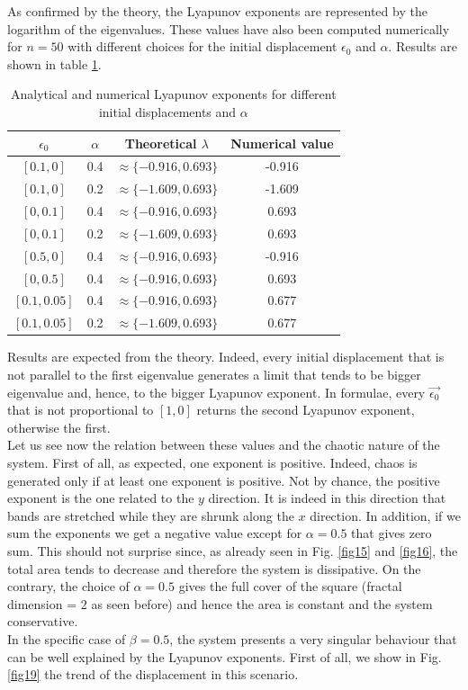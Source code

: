 \documentclass[11pt,titlepage]{article}
\begin{document}
As confirmed by the theory, the Lyapunov exponents are represented by the logarithm of the eigenvalues. These values have also been computed numerically for $n=50$ with different choices for the initial displacement $\epsilon_0$ and $\alpha$. Results are shown in table \ref{tab8}. \\

\begin{table}[h]
	\centering
	\caption{Analytical and numerical Lyapunov exponents for different initial displacements and $\alpha$} \label{tab8}
	\begin{tabular}{ | c |c | c | c |}
		\hline
		$\epsilon_0$ & $\alpha$ & Theoretical $\lambda$ & Numerical value \\
		\hline
		$[0.1,0]$ & 0.4 & $\approx \{ -0.916, 0.693\}$& -0.916\\
		\hline
		$[0.1,0]$ & 0.2 & $\approx \{ -1.609, 0.693\}$& -1.609\\
		\hline
		$[0,0.1]$ & 0.4& $\approx \{ -0.916, 0.693\}$& 0.693\\
		\hline
		$[0,0.1]$ & 0.2& $\approx \{ -1.609, 0.693\}$& 0.693\\
		\hline
		$[0.5,0]$& 0.4 & $\approx \{ -0.916, 0.693\}$& -0.916\\
		\hline
		$[0,0.5]$ & 0.4& $\approx \{ -0.916, 0.693\}$& 0.693\\
		\hline
		$[0.1,0.05]$ & 0.4 & $\approx \{ -0.916, 0.693\}$& 0.677\\
		\hline
		$[0.1,0.05]$& 0.2 & $\approx \{ -1.609, 0.693\}$& 0.677\\
		\hline
	\end{tabular}
\end{table}
Results are expected from the theory. Indeed, every initial displacement that is not parallel to the first eigenvalue generates a limit that tends to be bigger eigenvalue and, hence, to the bigger Lyapunov exponent. In formulae, every $\vec{\epsilon_0}$ that is not proportional to $[1,0]$ returns the second Lyapunov exponent, otherwise the first. \\
Let us see now the relation between these values and the chaotic nature of the system. First of all, as expected, one exponent is positive. Indeed, chaos is generated only if at least one exponent is positive. Not by chance, the positive exponent is the one related to the $y$ direction. It is indeed in this direction that bands are stretched while they are shrunk along the $x$ direction. In addition, if we sum the exponents we get a negative value except for $\alpha=0.5$ that gives zero sum. This should not surprise since, as already seen in Fig. \ref{fig15} and \ref{fig16}, the total area tends to decrease and therefore the system is dissipative. On the contrary, the choice of $\alpha=0.5$ gives the full cover of the square (fractal dimension = 2 as seen before) and hence the area is constant and the system conservative. \\
In the specific case of $\beta=0.5$, the system presents a very singular behaviour that can be well explained by the Lyapunov exponents. First of all, we show in Fig. \ref{fig19} the trend of the displacement in this scenario. \\
\end{document}
